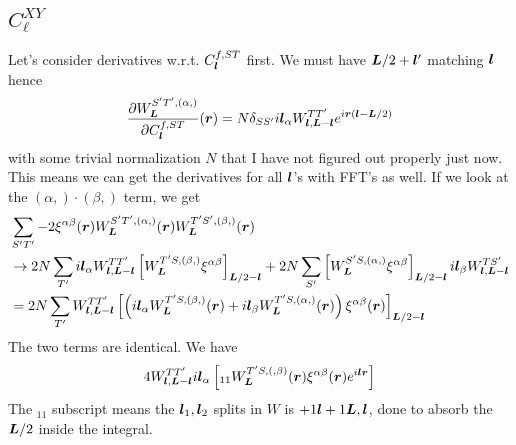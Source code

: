 \documentclass[prd, superscriptaddress, tightenlines, longbibliography, nofootinbib, eqsecnum, amsfonts, amsmath, floatfix, onecolumn, notitlepage]{revtex4-2}
\begin{document}
\subsection{$C_\ell^{XY}$}
Let's consider derivatives w.r.t. $C^{f, ST}_{\boldsymbol{l}}$ first.  We must have $\boldsymbol{L}/2 + \boldsymbol{l}'$ matching $\boldsymbol{l}$ hence
\begin{equation}
	\frac{\partial W_{\boldsymbol{L}}^{S'T', (\alpha,)}}{\partial C_{\boldsymbol{l}}^{f, ST}}(\boldsymbol{r}) = N\delta_{SS'}i\boldsymbol{l}_\alpha W^{TT'}_{\boldsymbol{l}, \boldsymbol{L}-\boldsymbol{l}}e^{i \boldsymbol{r} \left(\boldsymbol{l} - \boldsymbol{L}/2 \right)}
\end{equation}
with some trivial normalization $N$ that I have not figured out properly just now. This means we can get the derivatives for all $\boldsymbol{l}$'s with FFT's as well. 
If we look at the $(\alpha,) \cdot (\beta,)$ term, we get
\begin{equation}
\begin{split}
&\sum_{S'T'} -2 \xi^{\alpha\beta}(\boldsymbol{r})W_{\boldsymbol{L}}^{S'T',(\alpha,)}(\boldsymbol{r})W_{\boldsymbol{L}}^{T'S',(\beta,)}(\boldsymbol{r}) \\ &\rightarrow 2N \sum_{T'} i\boldsymbol{l}_\alpha W^{TT'}_{\boldsymbol{l}, \boldsymbol{L} - \boldsymbol{l}} \left[W_{\boldsymbol{L}}^{T'S, (\beta,)} \xi^{\alpha \beta}\right ]_{\boldsymbol{L}/2 - \boldsymbol{l}}  +2N\sum_{S'}\left[W_{\boldsymbol{L}}^{S'S, (\alpha,)} \xi^{\alpha \beta}\right ]_{\boldsymbol{L}/2 - \boldsymbol{l}}  i\boldsymbol{l}_\beta W^{TS'}_{\boldsymbol{l}, \boldsymbol{L} - \boldsymbol{l}} \\
&= 2 N \sum_{T'} W^{TT'}_{\boldsymbol{l}, \boldsymbol{L} - \boldsymbol{l}} \left[  \left(i\boldsymbol{l}_\alpha W_{\boldsymbol{L}}^{T'S, (\beta,)}(\boldsymbol{r}) + i\boldsymbol{l}_\beta W_{\boldsymbol{L}}^{T'S, (\alpha,)}(\boldsymbol{r}) \right )  \xi^{\alpha \beta}(\boldsymbol{r})\right]_{\boldsymbol{L}/2 - \boldsymbol{l}}
\end{split}
\end{equation}
The two terms are identical. We have
\begin{equation} 
4 W^{TT'}_{\boldsymbol{l}, \boldsymbol{L} - \boldsymbol{l}}	i \boldsymbol{l}_\alpha \left[ _{11}W^{T'S, (,\beta)}_{\boldsymbol{L}}(\boldsymbol{r}) \xi^{\alpha \beta}(\boldsymbol{r}) e^{i \boldsymbol{l} \boldsymbol{r}}\right]
\end{equation}
The $_{11}$ subscript means the $\boldsymbol{l}_1,\boldsymbol{l}_2$ splits in $W$ is $+1\boldsymbol{l} + 1\boldsymbol{L}, \boldsymbol{l} $, done to absorb the $\boldsymbol{L}/2$ inside the integral.
\end{document}
